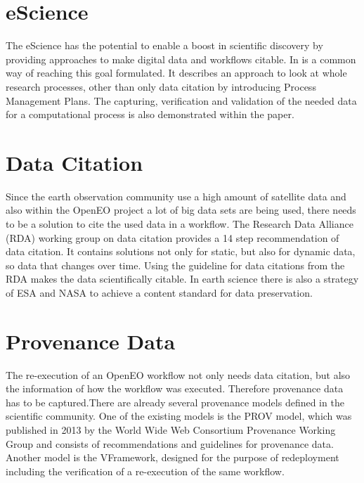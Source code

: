 \documentclass[draft,final]{vutinfth} %
\begin{document}
\section{eScience}
The eScience has the potential to enable a boost in scientific discovery by providing approaches to make digital data and workflows citable. In \cite{Rauber2015RepeatabilityAR} is a common way of reaching this goal formulated. It describes an approach to look at whole research processes, other than only data citation by introducing Process Management Plans. The capturing, verification and validation of the needed data for a computational process is also demonstrated within the paper.\cite{Rauber2015RepeatabilityAR}

\section{Data Citation}
Since the earth observation community use a high amount of satellite data and also within the OpenEO project a lot of big data sets are being used, there needs to be a solution to cite the used data in a workflow. The Research Data Alliance (RDA) working group on data citation provides a 14 step recommendation of data citation. It contains solutions not only for static, but also for dynamic data, so data that changes over time. Using the guideline for data citations from the RDA makes the data scientifically citable. \cite{rauber2016identification} 
In earth science there is also a strategy of ESA and NASA to achieve a content standard for data preservation.\cite{6352411}

\section{Provenance Data}
The re-execution of an OpenEO workflow not only needs data citation, but also the information of how the workflow was executed. Therefore provenance data has to be captured.\cite{Roure11towardsthe}There are already several provenance models defined in the scientific community. One of the existing models is the PROV model, which was published in 2013 by the World Wide Web Consortium Provenance Working Group and consists of recommendations and guidelines for provenance data.\cite{MOREAU2015235} 
Another model is the VFramework, designed for the purpose of redeployment including the verification of a re-execution of the same workflow. \cite{DBLP:conf/ipres/MiksaPMSVBR13}

\end{document}

